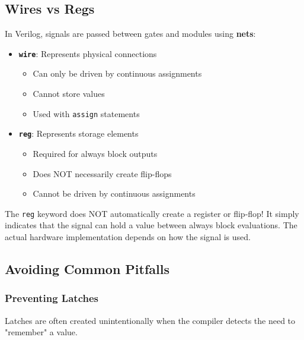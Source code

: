 \documentclass[12pt]{betterjournal}
\begin{document}
\subsection{Wires vs Regs}

\begin{important}[frametitle={Understanding Nets}]
In Verilog, signals are passed between gates and modules using \textbf{nets}:
\begin{itemize}
    \item \textbf{\texttt{wire}}: Represents physical connections
    \begin{itemize}
        \item Can only be driven by continuous assignments
        \item Cannot store values
        \item Used with \texttt{assign} statements
    \end{itemize}
    \item \textbf{\texttt{reg}}: Represents storage elements
    \begin{itemize}
        \item Required for always block outputs
        \item Does NOT necessarily create flip-flops
        \item Cannot be driven by continuous assignments
    \end{itemize}
\end{itemize}
\end{important}

\begin{extra}[frametitle={Common Misconception}]
The \texttt{reg} keyword does NOT automatically create a register or flip-flop! It simply indicates that the signal can hold a value between always block evaluations. The actual hardware implementation depends on how the signal is used.
\end{extra}

\subsection{Avoiding Common Pitfalls}

\subsubsection{Preventing Latches}

Latches are often created unintentionally when the compiler detects the need to "remember" a value.
\end{document}
